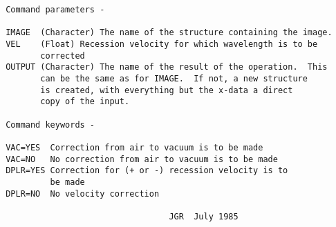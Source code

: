 \begin{description}
\begin{verbatim}
 Command parameters -

 IMAGE  (Character) The name of the structure containing the image.
 VEL    (Float) Recession velocity for which wavelength is to be
        corrected
 OUTPUT (Character) The name of the result of the operation.  This
        can be the same as for IMAGE.  If not, a new structure
        is created, with everything but the x-data a direct
        copy of the input.

 Command keywords -

 VAC=YES  Correction from air to vacuum is to be made
 VAC=NO   No correction from air to vacuum is to be made
 DPLR=YES Correction for (+ or -) recession velocity is to
          be made
 DPLR=NO  No velocity correction

                                  JGR  July 1985
\end{verbatim}
\end{description}
